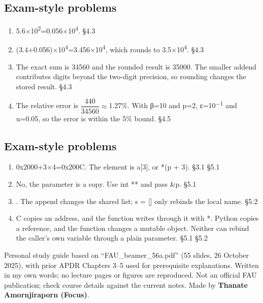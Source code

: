 \documentclass[11pt]{article}
\begin{document}
\begin{keepsection}\subsection{Exam-style problems}

\begin{enumerate}
\item 5.6\ensuremath{\times}10\textsuperscript{2}=0.056\ensuremath{\times}10\textsuperscript{4}. \hfill{\small\color{FAUblue}§4.3}
\item (3.4+0.056)\ensuremath{\times}10\textsuperscript{4}=3.456\ensuremath{\times}10\textsuperscript{4}, which rounds to 3.5\ensuremath{\times}10\textsuperscript{4}. \hfill{\small\color{FAUblue}§4.3}
\item The exact sum is 34560 and the rounded result is 35000. The smaller addend contributes digits beyond the two-digit precision, so rounding changes the stored result. \hfill{\small\color{FAUblue}§4.3}
\item The relative error is {\small\ensuremath{\dfrac{440}{34560}}}\ensuremath{\approx}1.27\%. With β=10 and p=2, ε=10\textsuperscript{\ensuremath{-}1} and u=0.05, so the error is within the 5\% bound. \hfill{\small\color{FAUblue}§4.5}
\end{enumerate}

\end{keepsection}
\begin{keepsection}\subsection{Exam-style problems}

\begin{enumerate}
\item 0x2000+3\ensuremath{\times}4=0x200C. The element is a[3], or *(p + 3). \hfill{\small\color{FAUblue}§3.1} \hfill{\small\color{FAUblue}§5.1}
\item No, the parameter is a copy. Use int ** and pass \&p. \hfill{\small\color{FAUblue}§5.1}
\item [0, 1]. The append changes the shared list; s = [] only rebinds the local name. \hfill{\small\color{FAUblue}§5.2}
\item C copies an address, and the function writes through it with *. Python copies a reference, and the function changes a mutable object. Neither can rebind the caller’s own variable through a plain parameter. \hfill{\small\color{FAUblue}§5.1} \hfill{\small\color{FAUblue}§5.2}
\end{enumerate}

\end{keepsection}

\vfill{\small Personal study guide based on “FAU\_beamer\_56a.pdf” (55 slides, 26 October 2025), with prior APDR Chapters 3–5 used for prerequisite explanations. Written in my own words; no lecture pages or figures are reproduced. Not an official FAU publication; check course details against the current notes. Made by \textbf{Thanate Amornjiraporn (Focus)}.}
\end{document}
